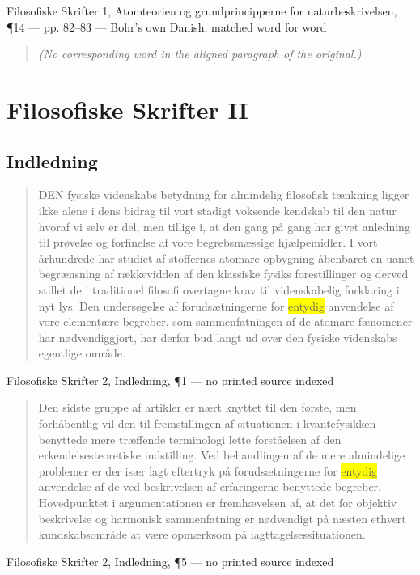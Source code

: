 \documentclass[11pt]{article}
\newcommand{\dcite}[1]{{\nopagebreak\raggedleft\small #1\par}\medskip}
\newcommand{\tlg}[1]{{\setlength{\fboxsep}{0.8pt}\colorbox{yellow}{#1}}}
\begin{document}
\dcite{Filosofiske Skrifter 1, Atomteorien og grundprincipperne for naturbeskrivelsen, ¶14 — pp. 82–83 — Bohr's own Danish, matched word for word}
{\footnotesize\begin{quote}\itshape (No corresponding word in the aligned paragraph of the original.)\end{quote}}

\section{Filosofiske Skrifter II}

\subsection{Indledning}

\begin{quote}
DEN fysiske videnskabs betydning for almindelig filosofisk tænkning ligger ikke alene i dens bidrag til vort stadigt voksende kendskab til den natur hvoraf vi selv er del, men tillige i, at den gang på gang har givet anledning til prøvelse og forfinelse af vore begrebsmæssige hjælpemidler. I vort århundrede har studiet af stoffernes atomare opbygning åbenbaret en uanet begrænsning af rækkevidden af den klassiske fysiks forestillinger og derved stillet de i traditionel filosofi overtagne krav til videnskabelig forklaring i nyt lys. Den undersøgelse af forudsætningerne for \tlg{entydig} anvendelse af vore elementære begreber, som sammenfatningen af de atomare fænomener har nødvendiggjort, har derfor bud langt ud over den fysiske videnskabs egentlige område.
\end{quote}
\dcite{Filosofiske Skrifter 2, Indledning, ¶1 — no printed source indexed}

\begin{quote}
Den sidste gruppe af artikler er nært knyttet til den første, men forhåbentlig vil den til fremstillingen af situationen i kvantefysikken benyttede mere træffende terminologi lette forståelsen af den erkendelsesteoretiske indstilling. Ved behandlingen af de mere almindelige problemer er der især lagt eftertryk på forudsætningerne for \tlg{entydig} anvendelse af de ved beskrivelsen af erfaringerne benyttede begreber. Hovedpunktet i argumentationen er fremhævelsen af, at det for objektiv beskrivelse og harmonisk sammenfatning er nødvendigt på næsten ethvert kundskabsområde at være opmærksom på iagttagelsessituationen.
\end{quote}
\dcite{Filosofiske Skrifter 2, Indledning, ¶5 — no printed source indexed}
\end{document}

